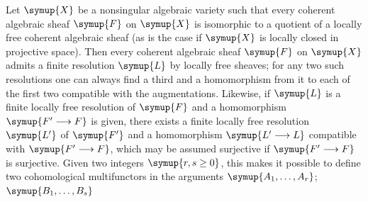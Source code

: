 Let $\symup{X}$ be a nonsingular algebraic variety such that every coherent algebraic
sheaf $\symup{F}$ on $\symup{X}$ is isomorphic to a quotient of a locally free coherent
algebraic sheaf (as is the case if $\symup{X}$ is locally closed in projective space).
Then every coherent algebraic sheaf $\symup{F}$ on $\symup{X}$ admits a finite resolution $\symup{L}$
by locally free sheaves; for any two such resolutions one can always find a
third and a homomorphism from it to each of the first two compatible with the
augmentations. Likewise, if $\symup{L}$ is a finite locally free resolution of $\symup{F}$ and
a homomorphism $\symup{F'\longrightarrow F}$ is given, there exists a finite locally
free resolution $\symup{L'}$ of $\symup{F'}$ and a homomorphism $\symup{L'\longrightarrow L}$
compatible with $\symup{F'\longrightarrow F}$, which may be assumed surjective if
$\symup{F'\longrightarrow F}$ is surjective. Given two integers $\symup{r,s\geq0}$, this makes
it possible to define two cohomological multifunctors in the arguments
$\symup{A_1,\ldots,A_r}$; $\symup{B_1,\ldots,B_s}$

